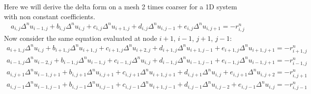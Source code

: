 \documentclass{warpdoc}
\begin{document}
Here we will derive the delta form on a mesh 2 times coarser for a 1D system with non constant coefficients. 
%
\begin{align}
   a_{i,j} \Delta^n u_{i-1,j} 
+  b_{i,j} \Delta^n u_{i,j} 
+  c_{i,j} \Delta^n u_{i+1,j} 
+  d_{i,j} \Delta^n u_{i,j-1} 
+  e_{i,j} \Delta^n u_{i,j+1} 
= -r_{i,j}^n
\label{eqn:mg2D1}
\end{align}
%
Now consider the same equation evaluated at node $i+1$, $i-1$, $j+1$, $j-1$:
%
\begin{align}
   a_{i+1,j} \Delta^n u_{i,j} 
+  b_{i+1,j} \Delta^n u_{i+1,j} 
+  c_{i+1,j} \Delta^n u_{i+2,j} 
+  d_{i+1,j} \Delta^n u_{i+1,j-1} 
+  e_{i+1,j} \Delta^n u_{i+1,j+1} 
= -r_{i+1,j}^n
\label{eqn:mg2D2}
\end{align}
%
%
\begin{align}
   a_{i-1,j} \Delta^n u_{i-2,j} 
+  b_{i-1,j} \Delta^n u_{i-1,j} 
+  c_{i-1,j} \Delta^n u_{i,j} 
+  d_{i-1,j} \Delta^n u_{i-1,j-1} 
+  e_{i-1,j} \Delta^n u_{i-1,j+1} 
= -r_{i-1,j}^n
\label{eqn:mg2D3}
\end{align}
%
%
\begin{align}
   a_{i,j+1} \Delta^n u_{i-1,j+1} 
+  b_{i,j+1} \Delta^n u_{i,j+1} 
+  c_{i,j+1} \Delta^n u_{i+1,j+1} 
+  d_{i,j+1} \Delta^n u_{i,j} 
+  e_{i,j+1} \Delta^n u_{i,j+2} 
= -r_{i,j+1}^n
\label{eqn:mg2D4}
\end{align}
%
%
\begin{align}
   a_{i,j-1} \Delta^n u_{i-1,j-1} 
+  b_{i,j-1} \Delta^n u_{i,j-1} 
+  c_{i,j-1} \Delta^n u_{i+1,j-1} 
+  d_{i,j-1} \Delta^n u_{i,j-2} 
+  e_{i,j-1} \Delta^n u_{i,j} 
= -r_{i,j-1}^n
\label{eqn:mg2D5}
\end{align}
%
\end{document}
